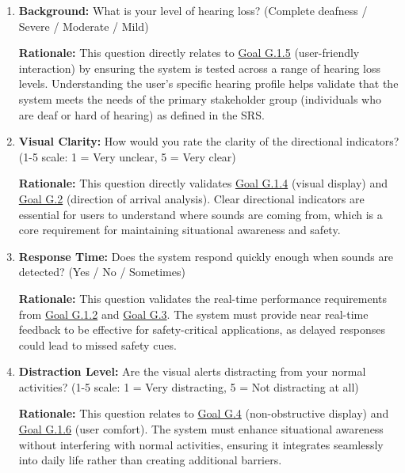 \documentclass[12pt, titlepage]{article}
\begin{document}
\begin{enumerate}
    \item \textbf{Background:} What is your level of hearing loss? (Complete
    deafness / Severe / Moderate / Mild)
    
    \textbf{Rationale:} This question directly relates to
    \hyperref[SRS-goal:user_friendly_interaction]{Goal G.1.5} (user-friendly
    interaction) by ensuring the system is tested across a range of hearing loss
    levels. Understanding the user's specific hearing profile helps validate
    that the system meets the needs of the primary stakeholder group
    (individuals who are deaf or hard of hearing) as defined in the SRS.
    
    \item \textbf{Visual Clarity:} How would you rate the clarity of the
    directional indicators? (1-5 scale: 1 = Very unclear, 5 = Very clear)
    
    \textbf{Rationale:} This question directly validates
    \hyperref[SRS-goal:visual_display]{Goal G.1.4} (visual display) and
    \hyperref[SRS-goal:audio_direction_analysis]{Goal G.2} (direction of arrival
    analysis). Clear directional indicators are essential for users to
    understand where sounds are coming from, which is a core requirement for
    maintaining situational awareness and safety.
    
    \item \textbf{Response Time:} Does the system respond quickly enough when
    sounds are detected? (Yes / No / Sometimes)
    
    \textbf{Rationale:} This question validates the real-time performance
    requirements from \hyperref[SRS-goal:audio_direction_analysis]{Goal G.1.2}
    and
    \hyperref[SRS-goal:audio_identification_analysis]{Goal G.3}. The system must
    provide near real-time feedback to be effective for safety-critical
    applications, as delayed responses could lead to missed safety cues.
    
    \item \textbf{Distraction Level:} Are the visual alerts distracting from
    your normal activities? (1-5 scale: 1 = Very distracting, 5 = Not
    distracting at all)
    
    \textbf{Rationale:} This question relates to
    \hyperref[SRS-goal:visual_display]{Goal G.4} (non-obstructive display) and
    \hyperref[SRS-goal:user_comfort]{Goal G.1.6} (user comfort). The system must
    enhance situational awareness without interfering with normal activities,
    ensuring it integrates seamlessly into daily life rather than creating
    additional barriers.
    

\end{enumerate}
\end{document}
